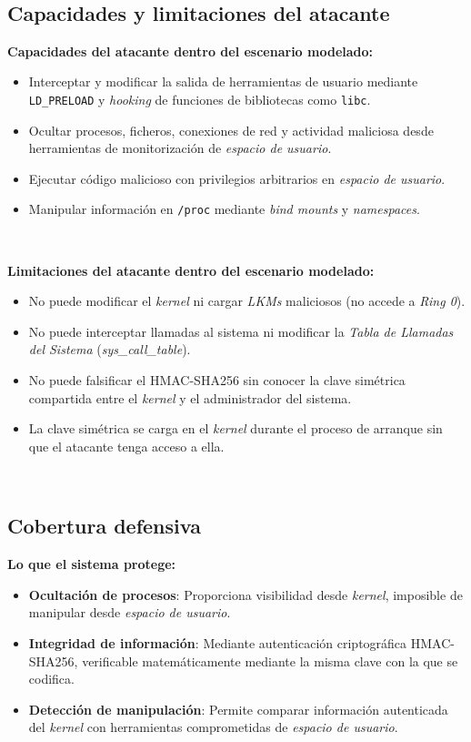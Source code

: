 \

\subsection{Capacidades y limitaciones del atacante}

\textbf{Capacidades del atacante dentro del escenario modelado:}

\begin{itemize}
    \item Interceptar y modificar la salida de herramientas de usuario mediante \texttt{LD\_PRELOAD} y \textit{hooking} de funciones de bibliotecas como \texttt{libc}.
    \item Ocultar procesos, ficheros, conexiones de red y actividad maliciosa desde herramientas de monitorización de \textit{espacio de usuario}.
    \item Ejecutar código malicioso con privilegios arbitrarios en \textit{espacio de usuario}.
    \item Manipular información en \texttt{/proc} mediante \textit{bind mounts} y \textit{namespaces}.
\end{itemize}

\

\textbf{Limitaciones del atacante dentro del escenario modelado:}

\begin{itemize}
    \item No puede modificar el \textit{kernel} ni cargar \textit{LKMs} maliciosos (no accede a \textit{Ring 0}).
    \item No puede interceptar llamadas al sistema ni modificar la \textit{Tabla de Llamadas del Sistema} (\textit{sys\_call\_table}).
    \item No puede falsificar el HMAC-SHA256 sin conocer la clave simétrica compartida entre el \textit{kernel} y el administrador del sistema.
    \item La clave simétrica se carga en el \textit{kernel} durante el proceso de arranque sin que el atacante tenga acceso a ella.
\end{itemize}

\

\subsection{Cobertura defensiva}

\textbf{Lo que el sistema protege:}

\begin{itemize}
    \item \textbf{Ocultación de procesos}: Proporciona visibilidad desde \textit{kernel}, imposible de manipular desde \textit{espacio de usuario}.
    \item \textbf{Integridad de información}: Mediante autenticación criptográfica HMAC-SHA256, verificable matemáticamente mediante la misma clave con la que se codifica.
    \item \textbf{Detección de manipulación}: Permite comparar información autenticada del \textit{kernel} con herramientas comprometidas de \textit{espacio de usuario}.
\end{itemize}

